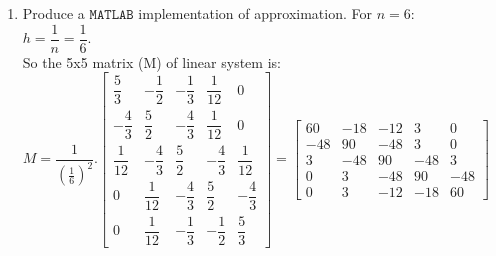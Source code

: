\documentclass[14pt,a4paper]{article}
\begin{document}
\begin{enumerate}
	We could form a linear system equation: \hspace{0.3cm} $M.u = g$\\
	$\hspace*{1cm} M = \dfrac{1}{h^2}.\begin{bmatrix} \dfrac{5}{3} & -\dfrac{1}{2} & -\dfrac{1}{3}& \dfrac{1}{12} &0& ... & ... & ... &0&0&0&0&0 \\ -\dfrac{4}{3}  &\dfrac{5}{2} & -\dfrac{4}{3} & \dfrac{1}{12} &0& ... & ... & ... &0&0&0&0&0 \\ \dfrac{1}{12} & -\dfrac{4}{3} &\dfrac{5}{2} & -\dfrac{4}{3} & \dfrac{1}{12} & ... & ... & ... &0&0&0&0&0 \\ ...& & ... & & ... & \ddots & & & & ... & & ...\\  ...& & ... & & ... & & & \ddots  & & ... & & ... \\ 0&0&0&0&0 & ... &...&...& 0& \dfrac{1}{12} & -\dfrac{4}{3} &\dfrac{5}{2} & -\dfrac{4}{3} \\ 0&0&0&0&0 & ... &...&...& 0& \dfrac{1}{12} & -\dfrac{1}{3} &-\dfrac{1}{2} & \dfrac{5}{3} \end{bmatrix}$\\
	
	\label{1e}
	\item Produce a $\mathtt{MATLAB}$ implementation of approximation. For $n = 6$: \\
	\hspace*{2.5cm} $ h = \dfrac{1}{n} = \dfrac{1}{6}$.\\
	 So the 5x5 matrix (M) of linear system is: \\
	\hspace*{1cm} $M = \dfrac{1}{(\frac{1}{6})^2}.\begin{bmatrix} \dfrac{5}{3} &-\dfrac{1}{2} & -\dfrac{1}{3} & \dfrac{1}{12} & 0 \\ -\dfrac{4}{3}  &\dfrac{5}{2} & -\dfrac{4}{3} & \dfrac{1}{12} &0 \\ \dfrac{1}{12} & -\dfrac{4}{3} & \dfrac{5}{2} & -\dfrac{4}{3} & \dfrac{1}{12} \\ 0& \dfrac{1}{12} & -\dfrac{4}{3} & \dfrac{5}{2} & -\dfrac{4}{3} \\ 0& \dfrac{1}{12} & -\dfrac{1}{3} &-\dfrac{1}{2} & \dfrac{5}{3}
	\end{bmatrix} = \begin{bmatrix} 60 & -18& -12& 3&0 \\ -48& 90& -48& 3 &0 \\ 3 & -48& 90& -48& 3 \\ 0& 3& -48& 90& -48 \\ 0& 3& -12& -18& 60 \end{bmatrix} $\\
	

\end{enumerate}
\end{document}
